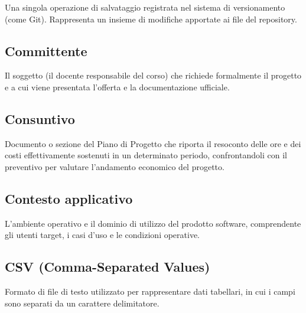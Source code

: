 \documentclass[a4paper, 11pt, oneside]{scrartcl} %
\begin{document}

Una singola operazione di salvataggio registrata nel sistema di versionamento (come Git). Rappresenta un insieme di modifiche apportate ai file del repository.

\vspace{0.5cm}

\subsection*{Committente}


Il soggetto (il docente responsabile del corso) che richiede formalmente il progetto e a cui viene presentata l'offerta e la documentazione ufficiale.

\vspace{0.5cm}

\subsection*{Consuntivo}
Documento o sezione del Piano di Progetto che riporta il resoconto delle ore e dei costi effettivamente sostenuti in un determinato periodo, confrontandoli con il preventivo per valutare l'andamento economico del progetto.
\vspace{0.5cm}

\subsection*{Contesto applicativo}


L'ambiente operativo e il dominio di utilizzo del prodotto software, comprendente gli utenti target, i casi d'uso e le condizioni operative.

\vspace{0.5cm}

\subsection*{CSV (Comma-Separated Values)}
Formato di file di testo utilizzato per rappresentare dati tabellari, in cui i campi sono separati da un carattere delimitatore.
\vspace{0.5cm}
\end{document}
